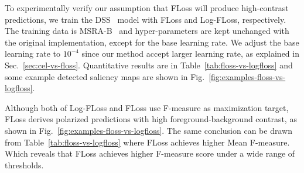 \documentclass[10pt,twocolumn,letterpaper]{article}
\newcommand{\CheckRmv}[1]{}
\newcommand{\CheckRmv}[1]{#1}
\begin{document}
\CheckRmv{
\begin{figure}[b]
  \centering
  \begin{overpic}[width=1\linewidth]{figures/floss-vs-logfloss3}
  \put(-1,41){\rotatebox{90}{Image}}
  \put(-1,30){\rotatebox{90}{GT}}
  \put(-1,14){\rotatebox{90}{\footnotesize{Log-FLoss}}}
  \put(-1,2){\rotatebox{90}{\small{FLoss}}}
  \end{overpic}
  \caption{Example saliency maps by FLoss (bottom) and Log-FLoss (middle).
  Our proposed FLoss method produces high-contrast saliency maps.
  }\label{fig:examples-floss-vs-logfloss}\vspace{0pt}
\end{figure}
}


\CheckRmv{
\begin{figure*}[!thb]
  \centering
  \begin{overpic}[width=0.95\linewidth]{figures/detection-examples}
  \put(3,65){Image}
  \put(17,65){GT}
  \put(26,65){DHS~\cite{liu2016dhsnet}}
  \put(39.5,65){\parbox{.5in}{F-DHS}}
  \put(50,65){Amulet~\cite{zhang2017amulet}}
  \put(64,65){F-Amulet}
  \put(78,65){DSS~\cite{hou2017deeply}}
  \put(90,65){\parbox{.5in}{F-DSS}}
  \end{overpic}
  \caption{Salient object detection examples on several popular datasets.
  F-DHS, F-Amulet and F-DSS indicate the original architectures trained with
our proposed FLoss. FLoss leads to sharp salient confidence, especially
  on the object boundaries.}\label{fig:examples}
\end{figure*}
}


To experimentally verify our assumption that FLoss will produce high-contrast predictions,
we train the DSS~\cite{hou2017deeply} model with FLoss and Log-FLoss, respectively.
%
The training data is MSRA-B~\cite{liu2011learning} and
hyper-parameters are kept unchanged with the original implementation, except for the base learning rate.
%
We adjust the base learning rate to $10^{-4}$ since our method accept larger learning rate, as explained
in Sec.~\ref{sec:cel-vs-floss}.
%
Quantitative results are in Table~\ref{tab:floss-vs-logfloss} and some example detected saliency maps
are shown in Fig.~\ref{fig:examples-floss-vs-logfloss}.

Although both of Log-FLoss
and FLoss use F-measure as maximization target,
FLoss derives polarized predictions with high foreground-background contrast,
as shown in Fig.~\ref{fig:examples-floss-vs-logfloss}.
%
The same conclusion can be drawn from Table~\ref{tab:floss-vs-logfloss} where
FLoss achieves higher Mean F-measure.
%
Which reveals that FLoss achieves higher
F-measure score under a wide range of thresholds.
\end{document}
